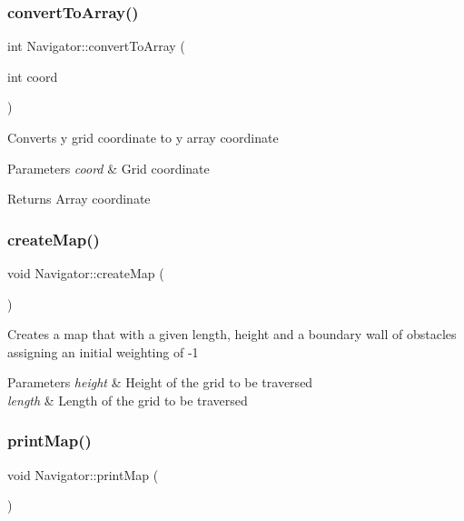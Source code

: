 \subsubsection{\texorpdfstring{convert\+To\+Array()}{convertToArray()}}
{\footnotesize\ttfamily int Navigator\+::convert\+To\+Array (\begin{DoxyParamCaption}\item[{int}]{coord }\end{DoxyParamCaption})\hspace{0.3cm}{\ttfamily [private]}}

Converts y grid coordinate to y array coordinate


\begin{DoxyParams}{Parameters}
{\em coord} & Grid coordinate ~\newline
 \\
\hline
\end{DoxyParams}
\begin{DoxyReturn}{Returns}
Array coordinate 
\end{DoxyReturn}
\mbox{\label{class_navigator_a8b0cb171e3e3b16b206278fb23f624bc}} 
\subsubsection{\texorpdfstring{create\+Map()}{createMap()}}
{\footnotesize\ttfamily void Navigator\+::create\+Map (\begin{DoxyParamCaption}{ }\end{DoxyParamCaption})\hspace{0.3cm}{\ttfamily [private]}}

Creates a map that with a given length, height and a boundary wall of obstacles assigning an initial weighting of -\/1


\begin{DoxyParams}{Parameters}
{\em height} & Height of the grid to be traversed \\
\hline
{\em length} & Length of the grid to be traversed \\
\hline
\end{DoxyParams}
\mbox{\label{class_navigator_a2565ae0fea67cfec45a553ef0d7e06a4}} 
\subsubsection{\texorpdfstring{print\+Map()}{printMap()}}
{\footnotesize\ttfamily void Navigator\+::print\+Map (\begin{DoxyParamCaption}{ }\end{DoxyParamCaption})}

